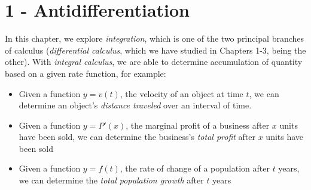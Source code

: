 \documentclass{report}
\begin{document}
\section*{1 - Antidifferentiation}
\begin{mdframed}
  
In this chapter, we explore \textit{integration}, which is one of the two principal branches of calculus (\textit{differential calculus}, which we have studied in Chapters 1-3, being the other).
\bigbreak \noindent
With \textit{integral calculus}, we are able to determine accumulation of quantity based on a given rate function, for example:
\begin{itemize}[label=$\circ$]
  \item Given a function $ y = v(t)$, the velocity of an object at time $t$, we can determine an object's \textit{distance traveled} over an interval of time.
  \item Given a function $y=P'(x)$, the marginal profit of a business after $x$ units have been sold, we can determine the business's \textit{total profit} after $x$ units have been sold
  \item Given a function $y=f(t)$, the rate of change of a population after $t$ years, we can determine the \textit{total population growth} after $t$ years
\end{itemize}
\end{mdframed}
\bigbreak \noindent
\end{document}
